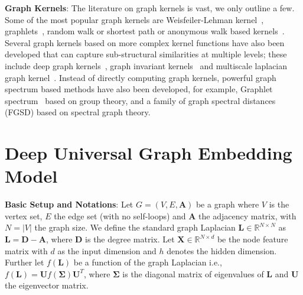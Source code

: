\documentclass{article}
\begin{document}
\textbf{Graph Kernels}: The literature on graph kernels is vast, we only outline a few. Some of the most popular graph kernels are Weisfeiler-Lehman   kernel~\cite{shervashidze2011weisfeiler}, graphlets~\cite{prvzulj2007biological,shervashidze2009efficient}, random walk or shortest path or anonymous walk based kernels~\cite{kashima2003marginalized,borgwardt2005shortest, ivanov2018anonymous}. Several graph kernels   based on more complex kernel functions have also been developed  that can capture sub-structural similarities at multiple levels; these include deep graph kernels~\cite{yanardag2015deep}, graph invariant  kernels~\cite{orsini2015graph} and  multiscale laplacian graph kernel~\cite{kondor2016multiscale}. Instead of directly computing graph kernels,  powerful  graph spectrum based methods have also been developed, for example,
Graphlet spectrum~\cite{kondor2009graphlet}   based on group theory,  and a family of graph spectral distances (FGSD)   based on spectral graph theory.






































\vspace{-1em}
\section{Deep Universal Graph Embedding Model}\label{sec:model}
\vspace{-0.5em}
\noindent \textbf{Basic Setup and  Notations}: Let   $G=(V,E,\mathbf{A})$ be a graph   where $V$ is the vertex set, $E$ the edge set (with no self-loops) and $\mathbf{A}$ the       adjacency matrix, with  $N=|V|$ the graph size. We define the standard graph Laplacian $\mathbf{L}  \in \mathbb{R}^{N \times N} $ as $\mathbf{L}=\mathbf{D}-\mathbf{A} $, where $\mathbf{D}$ is the degree matrix. Let $\mathbf{X}\in \mathbb{R}^{N \times d}$ be the node feature matrix with $d$ as the input dimension and  $h$   denotes the hidden dimension.   Further let $f(\mathbf{L})$ be a function of the graph Laplacian i.e.,  $f(\mathbf{L})=\mathbf{U}f(\mathbf{\Sigma})\mathbf{U}^{T}$,  where $\mathbf{\Sigma}$ is the diagonal matrix  of  eigenvalues of $\mathbf{L}$ and $\mathbf{U}$ the eigenvector matrix. 
\end{document}
